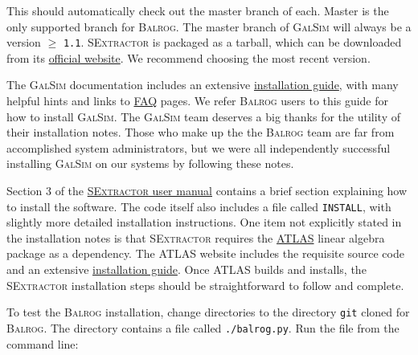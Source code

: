 \documentclass[11pt]{book}
\newcommand{\codett}[1]{\texttt{#1}}
\newcommand{\galsim}{\textsc{GalSim}}
\newcommand{\balrog}{\textsc{Balrog}}
\newcommand{\sex}{\textsc{SExtractor}}
\begin{document}
\begin{cmdline}
\end{cmdline}

\noindent This should automatically check out the master branch of each.
Master is the only supported branch for \balrog{}. 
The master branch of \galsim{} will always be a version $\geq$ \codett{1.1}.
\sex{} is packaged as a tarball, which can be downloaded 
from its \href{https://www.astromatic.net/software/sextractor}{official website}.
We recommend choosing the most recent version.

The \galsim{} documentation includes an extensive
\href{https://github.com/GalSim-developers/GalSim/blob/releases/1.0/INSTALL.md}{installation guide},
with many helpful hints and links to \href{https://github.com/GalSim-developers/GalSim/wiki/Installation\%20FAQ}{FAQ} pages. 
We refer \balrog{} users to this guide for how to install \galsim{}.
The \galsim{} team deserves a big thanks for the utility of their installation notes.
Those who make up the the \balrog{} team are far from accomplished system administrators, 
but we were all independently successful installing \galsim{} on our systems by following these notes.

Section 3 of the \href{https://www.astromatic.net/pubsvn/software/sextractor/trunk/doc/sextractor.pdf}{\sex{} user manual}
contains a brief section explaining how to install the software. The code itself also includes a file called \codett{INSTALL}, with
slightly more detailed installation instructions.
One item not explicitly stated in the installation notes is that \sex{} requires the \href{http://math-atlas.sourceforge.net/}{ATLAS}
linear algebra package as a dependency.
The ATLAS website includes the requisite source code and
an extensive \href{http://math-atlas.sourceforge.net/atlas_install/}{installation guide}.
Once ATLAS builds and installs, the \sex{} installation steps should be straightforward to follow and complete.

To test the \balrog{} installation, change directories to the directory \codett{git} cloned for \balrog{}.
The directory contains a file called \codett{./balrog.py}. Run the file from the command line:

\begin{cmdline}
\end{cmdline}
\end{document}
